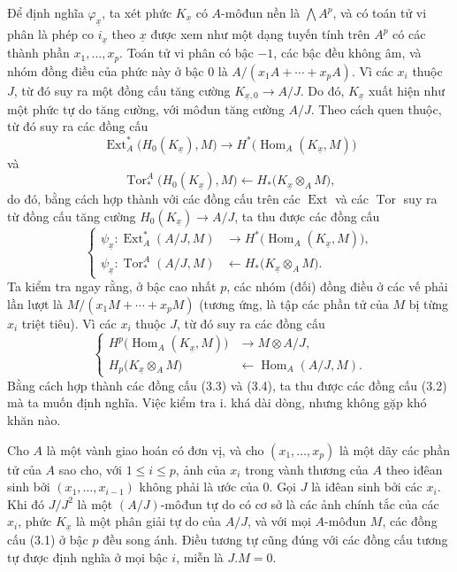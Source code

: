 Để định nghĩa $\varphi_{\underline{x}}$, ta xét phức
$K_{\underline{x}}$ có $A$-môđun nền là $\bigwedge A^{p}$, và
có toán tử vi phân là phép co $i_{\underline{x}}$ theo
$\underline{x}$ được xem như một dạng tuyến tính trên $A^{p}$ có các thành phần
$x_1,\ldots,x_p$. Toán tử vi phân có bậc $-1$, các bậc đều
không âm, và nhóm đồng điều của phức này ở bậc $0$ là
$A/(x_1A+\cdots+x_pA)$. Vì các $x_i$ thuộc $J$, từ đó suy ra một
đồng cấu tăng cường $K_{\underline{x},0}\longrightarrow A/J$. Do đó,
$K_{\underline{x}}$ xuất hiện như một phức tự do tăng cường, với môđun
tăng cường $A/J$. Theo cách quen thuộc, từ đó suy ra các đồng cấu
\[
\operatorname{Ext}_{A}^{*}\bigl(H_0(K_{\underline{x}}),M\bigr)
\longrightarrow
H^{*}\bigl(\operatorname{Hom}_{A}(K_{\underline{x}},M)\bigr)
\]
và
\[
\operatorname{Tor}_{*}^{A}\bigl(H_0(K_{\underline{x}}),M\bigr)
\longleftarrow
H_{*}\bigl(K_{\underline{x}}\otimes_A M\bigr),
\]
do đó, bằng cách hợp thành với các đồng cấu trên các $\operatorname{Ext}$ và các
$\operatorname{Tor}$ suy ra từ đồng cấu tăng cường
$H_0(K_{\underline{x}})\longrightarrow A/J$, ta thu được các đồng cấu
\begin{equation}\tag{3.3}
\left\{
\begin{aligned}
\psi_{\underline{x}}:
\operatorname{Ext}_{A}^{*}(A/J,M)
&\longrightarrow H^{*}\bigl(\operatorname{Hom}_{A}(K_{\underline{x}},M)\bigr),\\
\psi_{\underline{x}}:
\operatorname{Tor}_{*}^{A}(A/J,M)
&\longleftarrow H_{*}\bigl(K_{\underline{x}}\otimes_A M\bigr).
\end{aligned}
\right.
\end{equation}
Ta kiểm tra ngay rằng, ở bậc cao nhất $p$, các nhóm (đối) đồng điều ở các vế
phải lần lượt là $M/(x_1M+\cdots+x_pM)$ (tương ứng, là tập các phần tử của $M$
bị từng $x_i$ triệt tiêu). Vì các $x_i$ thuộc $J$, từ đó suy ra các
đồng cấu
\begin{equation}\tag{3.4}
\left\{
\begin{aligned}
H^{p}\bigl(\operatorname{Hom}_{A}(K_{\underline{x}},M)\bigr)
&\longrightarrow M\otimes A/J,\\
H_{p}\bigl(K_{\underline{x}}\otimes_A M\bigr)
&\longleftarrow\operatorname{Hom}_{A}(A/J,M).
\end{aligned}
\right.
\end{equation}
Bằng cách hợp thành các đồng cấu (3.3) và (3.4), ta thu được các đồng cấu (3.2)
mà ta muốn định nghĩa. Việc kiểm tra i. khá dài dòng, nhưng không
gặp khó khăn nào.

 Cho $A$ là một vành giao hoán có đơn vị, và cho
$(x_1,\ldots,x_p)$ là một dãy các phần tử của $A$ sao cho, với $1\leq i\leq p$,
ảnh của $x_i$ trong vành thương của $A$ theo iđêan sinh bởi
$(x_1,\ldots,x_{i-1})$ không phải là ước của $0$. Gọi $J$ là iđêan sinh
bởi các $x_i$. Khi đó $J/J^{2}$ là một $(A/J)$-môđun tự do có cơ sở là các
ảnh chính tắc của các $x_i$, phức $K_{\underline{x}}$ là một
phân giải tự do của $A/J$, và với mọi $A$-môđun $M$, các đồng cấu (3.1) ở
bậc $p$ đều song ánh. Điều tương tự cũng đúng với các đồng cấu tương tự
được định nghĩa ở mọi bậc $i$, miễn là $J.M=0$.


